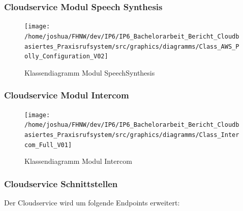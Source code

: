 \clearpage
\subsubsection{Cloudservice Modul Speech Synthesis}

\begin{figure}[h]
    \centering
    \begin{minipage}[b]{1\textwidth}
        \texttt{[image: /home/joshua/FHNW/dev/IP6/IP6\_Bachelorarbeit\_Bericht\_Cloudbasiertes\_Praxisrufsystem/src/graphics/diagramms/Class\_AWS\_Polly\_Configuration\_V02]}
        \caption{Klassendiagramm Modul SpeechSynthesis}
    \end{minipage}
\end{figure}

\clearpage

\subsubsection{Cloudservice Modul Intercom}
\begin{figure}[h]
    \centering
    \begin{minipage}[b]{1\textwidth}
        \texttt{[image: /home/joshua/FHNW/dev/IP6/IP6\_Bachelorarbeit\_Bericht\_Cloudbasiertes\_Praxisrufsystem/src/graphics/diagramms/Class\_Intercom\_Full\_V01]}
        \caption{Klassendiagramm Modul Intercom}
    \end{minipage}
\end{figure}

\clearpage

\subsubsection{Cloudservice Schnittstellen}

Der Cloudservice wird um folgende Endpoints erweitert:


